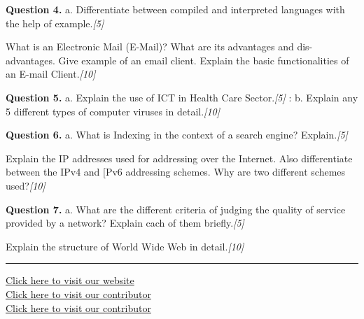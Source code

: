 \documentclass[11pt,a4paper]{article}
\newcommand{\pts}[1]{\hfill\textit{[#1]}}
\begin{document}
\medskip\noindent\textbf{Question 4.} a. Differentiate between compiled and interpreted languages with the help of example.\pts{5}
\begin{parts}
  \item What is an Electronic Mail (E-Mail)? What are its advantages and dis-advantages. Give
  example of an email client. Explain the basic functionalities of an E-mail Client.\pts{10}
\end{parts}

\medskip\noindent\textbf{Question 5.} a. Explain the use of ICT in Health Care Sector.\pts{5}
: b. Explain any 5 different types of computer viruses in detail.\pts{10}

\medskip\noindent\textbf{Question 6.} a. What is Indexing in the context of a search engine? Explain.\pts{5}
\begin{parts}
  \item Explain the IP addresses used for addressing over the Internet. Also differentiate between the
  IPv4 and [Pv6 addressing schemes. Why are two different schemes used?\pts{10}
\end{parts}

\medskip\noindent\textbf{Question 7.} a. What are the different criteria of judging the quality of service provided by a network?
Explain cach of them briefly.\pts{5}
\begin{parts}
  \item Explain the structure of World Wide Web in detail.\pts{10}
\end{parts}

\vfill
\rule{\linewidth}{0.4pt}
\begin{center}\small
\href{https://bhu-exam.vercel.app/}{Click here to visit our website}\\[4pt]\href{https://me-aryan.vercel.app/}{Click here to visit our contributor}\\[4pt]\href{https://quashan-me.vercel.app/}{Click here to visit our contributor}
\end{center}
\end{document}
